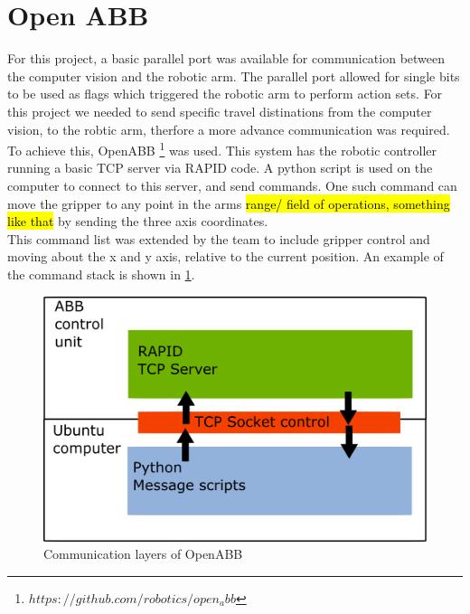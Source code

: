 \documentclass[11pt,a4paper]{report}
\begin{document}
\section{Open ABB}
For this project, a basic parallel port was available for communication between the computer vision and the robotic arm. The parallel port allowed for single bits to be used as flags which triggered the robotic arm to perform action sets. For this project we needed to send specific travel distinations from the computer vision, to the robtic arm, therfore a more advance communication was required. To achieve this, OpenABB \footnote{$https://github.com/robotics/open_abb$} was used. This system has the robotic controller running a basic TCP server via RAPID code. A python script is used on the computer to connect to this server, and send commands. One such command can move the gripper to any point in the arms \hl{range/ field of operations, something like that} by sending the three axis coordinates.\\
This command list was extended by the team to  include gripper control and moving about the x and y axis, relative to the current position. 
An example of the command stack is shown in \cref{fig:commstack1}.
\begin{figure}[h]
\centering
\includegraphics[width=0.7\linewidth]{commstack1}
\caption{Communication layers of OpenABB}
\label{fig:commstack1}
\end{figure}
\end{document}
